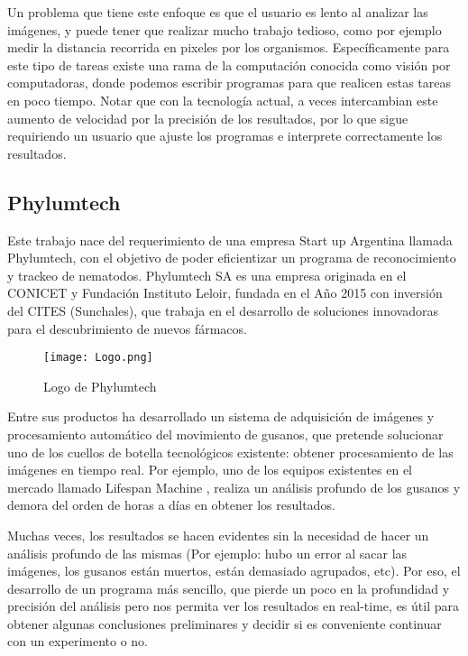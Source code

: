 \documentclass{article}
\begin{document}
Un problema que tiene este enfoque es que el usuario es lento al analizar las imágenes, y puede tener que realizar mucho trabajo tedioso, como por ejemplo medir la distancia recorrida en pixeles por los organismos. Específicamente para este tipo de tareas existe una rama de la computación conocida como visión por computadoras, donde podemos escribir programas para que realicen estas tareas en poco tiempo. Notar que con la tecnología actual, a veces intercambian este aumento de velocidad por la precisión de los resultados, por lo que sigue requiriendo un usuario que ajuste los programas e interprete correctamente los resultados.

\subsection{Phylumtech}
Este trabajo nace del requerimiento de una empresa Start up Argentina llamada Phylumtech, con el objetivo de poder eficientizar un programa de reconocimiento y trackeo de nematodos. Phylumtech SA es una empresa originada en el CONICET y Fundación Instituto Leloir, fundada en el Año 2015 con inversión del CITES (Sunchales), que trabaja en el desarrollo de soluciones innovadoras para el descubrimiento de nuevos fármacos.

\begin{wrapfigure}{l}{0.4\textwidth}
\centering
    \texttt{[image: Logo.png]}
    \label{label 2}
    \caption{Logo de Phylumtech}
\end{wrapfigure}

Entre sus productos ha desarrollado un sistema de adquisición de imágenes y procesamiento automático del movimiento de gusanos, que pretende solucionar uno de los cuellos de botella tecnológicos existente: obtener procesamiento de las imágenes en tiempo real. Por ejemplo, uno de los equipos existentes en el mercado llamado Lifespan Machine \cite{LifeMach}, realiza un análisis profundo de los gusanos y demora del orden de horas a días en obtener los resultados.

Muchas veces, los resultados se hacen evidentes sin la necesidad de hacer un análisis profundo de las mismas (Por ejemplo: hubo un error al sacar las imágenes, los gusanos están muertos, están demasiado agrupados, etc). Por eso, el desarrollo de un programa más sencillo, que pierde un poco en la profundidad y precisión del análisis pero nos permita ver los resultados en real-time, es útil para obtener algunas conclusiones preliminares y decidir si es conveniente continuar con un experimento o no.
\end{document}
